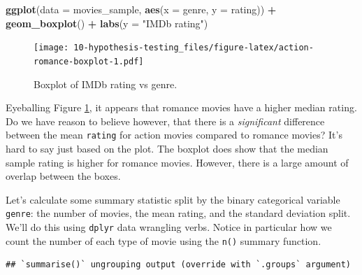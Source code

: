 \documentclass[
]{book}
\newenvironment{Shaded}{\begin{snugshade}}{\end{snugshade}}
\newcommand{\DataTypeTok}[1]{\textcolor[rgb]{0.13,0.29,0.53}{#1}}
\newcommand{\KeywordTok}[1]{\textcolor[rgb]{0.13,0.29,0.53}{\textbf{#1}}}
\newcommand{\NormalTok}[1]{#1}
\newcommand{\OperatorTok}[1]{\textcolor[rgb]{0.81,0.36,0.00}{\textbf{#1}}}
\newcommand{\StringTok}[1]{\textcolor[rgb]{0.31,0.60,0.02}{#1}}
\begin{document}
\begin{Shaded}
\begin{Highlighting}[]
\KeywordTok{ggplot}\NormalTok{(}\DataTypeTok{data =}\NormalTok{ movies_sample, }\KeywordTok{aes}\NormalTok{(}\DataTypeTok{x =}\NormalTok{ genre, }\DataTypeTok{y =}\NormalTok{ rating)) }\OperatorTok{+}
\StringTok{  }\KeywordTok{geom_boxplot}\NormalTok{() }\OperatorTok{+}
\StringTok{  }\KeywordTok{labs}\NormalTok{(}\DataTypeTok{y =} \StringTok{"IMDb rating"}\NormalTok{)}
\end{Highlighting}
\end{Shaded}

\begin{figure}
\centering
\texttt{[image: 10-hypothesis-testing\_files/figure-latex/action-romance-boxplot-1.pdf]}
\caption{\label{fig:action-romance-boxplot}Boxplot of IMDb rating vs genre.}
\end{figure}

Eyeballing Figure \ref{fig:action-romance-boxplot}, it appears that romance movies have a higher median rating. Do we have reason to believe however, that there is a \emph{significant} difference between the mean \texttt{rating} for action movies compared to romance movies? It's hard to say just based on the plot. The boxplot does show that the median sample rating is higher for romance movies. However, there is a large amount of overlap between the boxes.

Let's calculate some summary statistic split by the binary categorical variable \texttt{genre}: the number of movies, the mean rating, and the standard deviation split. We'll do this using \texttt{dplyr} data wrangling verbs. Notice in particular how we count the number of each type of movie using the \texttt{n()} summary function.

\begin{Shaded}
\end{Shaded}

\begin{verbatim}
## `summarise()` ungrouping output (override with `.groups` argument)
\end{verbatim}
\end{document}
